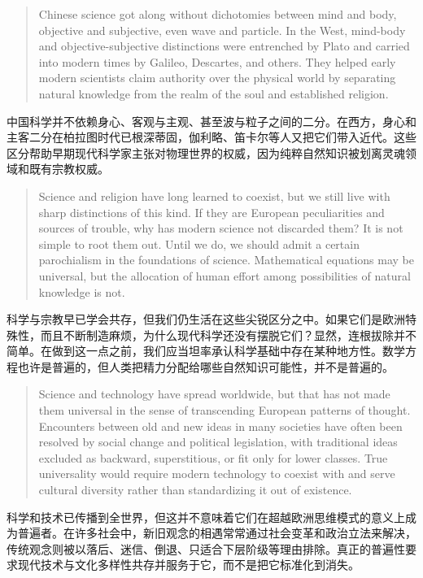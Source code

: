 \documentclass[UTF8,zihao=-4]{ctexart}
\newenvironment{enblock}
  {\par\smallskip\noindent{\scriptsize\bfseries English}\par\begin{quote}\small}
  {\end{quote}}
\newenvironment{zhblock}
  {\par\noindent{\scriptsize\bfseries 中文}\par}
  {\par\medskip}
\begin{document}
\begin{enblock}
Chinese science got along without dichotomies between mind and body, objective and subjective, even wave and particle. In the West, mind-body and objective-subjective distinctions were entrenched by Plato and carried into modern times by Galileo, Descartes, and others. They helped early modern scientists claim authority over the physical world by separating natural knowledge from the realm of the soul and established religion.
\end{enblock}
\begin{zhblock}
中国科学并不依赖身心、客观与主观、甚至波与粒子之间的二分。在西方，身心和主客二分在柏拉图时代已根深蒂固，伽利略、笛卡尔等人又把它们带入近代。这些区分帮助早期现代科学家主张对物理世界的权威，因为纯粹自然知识被划离灵魂领域和既有宗教权威。
\end{zhblock}

\begin{enblock}
Science and religion have long learned to coexist, but we still live with sharp distinctions of this kind. If they are European peculiarities and sources of trouble, why has modern science not discarded them? It is not simple to root them out. Until we do, we should admit a certain parochialism in the foundations of science. Mathematical equations may be universal, but the allocation of human effort among possibilities of natural knowledge is not.
\end{enblock}
\begin{zhblock}
科学与宗教早已学会共存，但我们仍生活在这些尖锐区分之中。如果它们是欧洲特殊性，而且不断制造麻烦，为什么现代科学还没有摆脱它们？显然，连根拔除并不简单。在做到这一点之前，我们应当坦率承认科学基础中存在某种地方性。数学方程也许是普遍的，但人类把精力分配给哪些自然知识可能性，并不是普遍的。
\end{zhblock}

\begin{enblock}
Science and technology have spread worldwide, but that has not made them universal in the sense of transcending European patterns of thought. Encounters between old and new ideas in many societies have often been resolved by social change and political legislation, with traditional ideas excluded as backward, superstitious, or fit only for lower classes. True universality would require modern technology to coexist with and serve cultural diversity rather than standardizing it out of existence.
\end{enblock}
\begin{zhblock}
科学和技术已传播到全世界，但这并不意味着它们在超越欧洲思维模式的意义上成为普遍者。在许多社会中，新旧观念的相遇常常通过社会变革和政治立法来解决，传统观念则被以落后、迷信、倒退、只适合下层阶级等理由排除。真正的普遍性要求现代技术与文化多样性共存并服务于它，而不是把它标准化到消失。
\end{zhblock}
\end{document}
